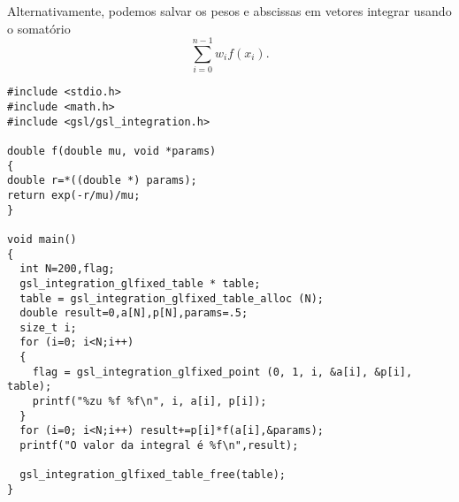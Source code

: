 Alternativamente, podemos salvar os pesos e abscissas em vetores integrar usando o somatório
$$
\sum_{i=0}^{n-1}w_if(x_i).
$$
\begin{verbatim}
#include <stdio.h>
#include <math.h>
#include <gsl/gsl_integration.h>

double f(double mu, void *params)
{
double r=*((double *) params);
return exp(-r/mu)/mu;
}

void main()
{
  int N=200,flag;
  gsl_integration_glfixed_table * table;
  table = gsl_integration_glfixed_table_alloc (N);
  double result=0,a[N],p[N],params=.5;
  size_t i;
  for (i=0; i<N;i++)
  {
    flag = gsl_integration_glfixed_point (0, 1, i, &a[i], &p[i], table);
    printf("%zu %f %f\n", i, a[i], p[i]);
  }
  for (i=0; i<N;i++) result+=p[i]*f(a[i],&params);
  printf("O valor da integral é %f\n",result);

  gsl_integration_glfixed_table_free(table);
}
\end{verbatim}



